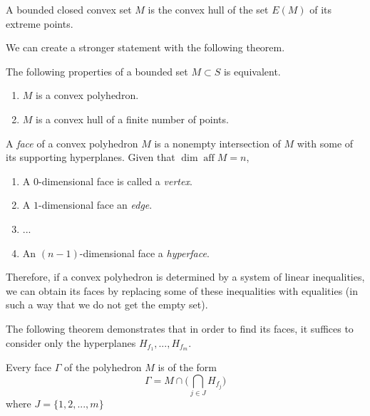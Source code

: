 \documentclass{article}
\DeclareMathOperator{\aff}{aff}
\begin{document}
    \begin{theorem}
      A bounded closed convex set $M$ is the convex hull of the set $E(M)$ of its extreme points. 
    \end{theorem}

    We can create a stronger statement with the following theorem. 

    \begin{theorem}
      The following properties of a bounded set $M \subset S$ is equivalent.
      \begin{enumerate}
        \item $M$ is a convex polyhedron. 
        \item $M$ is a convex hull of a finite number of points. 
      \end{enumerate}
    \end{theorem}

    \begin{definition}
      A \textit{face} of a convex polyhedron $M$ is a nonempty intersection of $M$ with some of its supporting hyperplanes. Given that $\dim \aff M = n$, 
      \begin{enumerate}
        \item A $0$-dimensional face is called a \textit{vertex}. 
        \item A $1$-dimensional face an \textit{edge}. 
        \item ...
        \item An $(n-1)$-dimensional face a \textit{hyperface}. 
      \end{enumerate}
    \end{definition}

    Therefore, if a convex polyhedron is determined by a system of linear inequalities, we can obtain its faces by replacing some of these inequalities with equalities (in such a way that we do not get the empty set). 

    The following theorem demonstrates that in order to find its faces, it suffices to consider only the hyperplanes $H_{f_1}, ..., H_{f_m}$. 

    \begin{theorem}
      Every face $\Gamma$ of the polyhedron $M$ is of the form
      \begin{equation}
        \Gamma = M \cap \bigg( \bigcap_{j \in J} H_{f_j} \bigg)
      \end{equation}
      where $J = \{1, 2, ..., m\}$
    \end{theorem}
\end{document}
